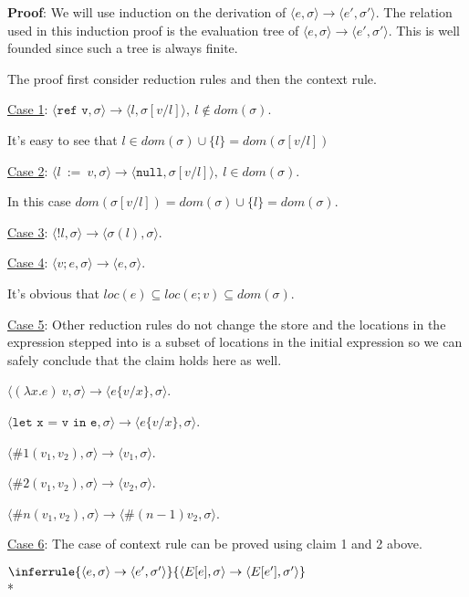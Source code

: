 \documentclass[10pt]{article}
\newcommand{\Rule}[3]{
    \label{rule:#1}
  \hfill
  \ensuremath{\inferrule{#2}{#3}}
  \hfill
}
\begin{document}
\begin{enumerate} [(a)]
    \textbf{Proof}: We will use induction on the derivation of $\langle e, \sigma \rangle \rightarrow \langle e', \sigma' \rangle$. The relation used in this induction proof is the evaluation tree of $\langle e, \sigma \rangle \rightarrow \langle e', \sigma' \rangle$. This is well founded since such a tree is always finite.

    The proof first consider reduction rules and then the context rule.

    \underline{Case 1}: $\langle \texttt{ref v}, \sigma \rangle \rightarrow \langle l, \sigma[v/l] \rangle,~l \notin dom(\sigma)$.

    It's easy to see that $l \in dom(\sigma) \cup \{l\} = dom(\sigma[v/l])$

    \underline{Case 2}: $\langle l~:=~v, \sigma \rangle \rightarrow \langle \texttt{null}, \sigma[v/l] \rangle,~l \in dom(\sigma)$.

    In this case $dom(\sigma[v/l]) = dom(\sigma) \cup \{l\} = dom(\sigma)$.

    \underline{Case 3}: $\langle !l, \sigma \rangle \rightarrow \langle \sigma(l), \sigma\rangle$.

    \underline{Case 4}: $\langle v;e, \sigma \rangle \rightarrow \langle e, \sigma \rangle$.

    It's obvious that $loc(e) \subseteq loc(e;v) \subseteq dom(\sigma)$.

    \underline{Case 5}: Other reduction rules do not change the store and the locations in the expression stepped into is a subset of locations in the initial expression so we can safely conclude that the claim holds here as well.

    $\langle (\lambda x.e)~v, \sigma \rangle \rightarrow \langle e\{v/x\}, \sigma \rangle$.

    $\langle \texttt{let x = v in e}, \sigma \rangle \rightarrow \langle e\{v/x\}, \sigma \rangle$.

    $\langle \#1(v_1, v_2), \sigma \rangle \rightarrow \langle v_1, \sigma \rangle$.

    $\langle \#2(v_1, v_2), \sigma \rangle \rightarrow \langle v_2, \sigma \rangle$.

    $\langle \#n(v_1, v_2), \sigma \rangle \rightarrow \langle \#(n-1)v_2, \sigma \rangle$.

    \underline{Case 6}: The case of context rule can be proved using claim 1 and 2 above.

    \Rule{}{
    \langle e, \sigma \rangle \rightarrow \langle e', \sigma' \rangle
  }{
    \langle E[e], \sigma \rangle \rightarrow \langle E[e'], \sigma' \rangle
  } \\*


\end{enumerate}
\end{document}
